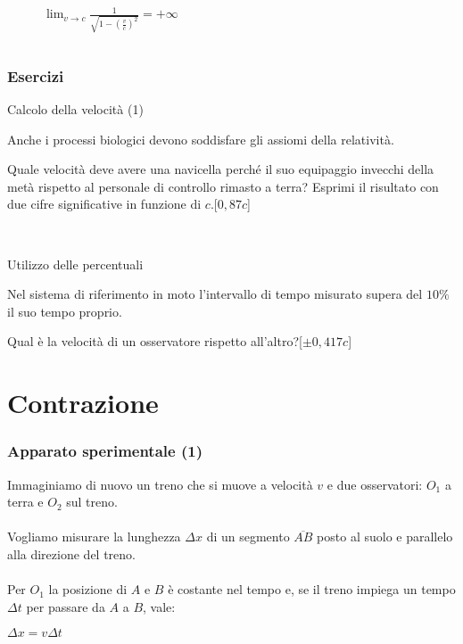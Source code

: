\documentclass[]{beamer}
\theoremstyle{plain}
\begin{document}
\begin{frame}
\begin{columns}
\begin{column}{0.6\textwidth}
\begin{figure}
~

\footnotesize
$ \displaystyle \lim_{v \to c} \frac{1}{\sqrt{1- \left( \frac{v}{c} \right)^2 }} = + \infty  $

\end{figure}
\end{column}
\end{columns}
\end{frame}





\begin{frame}
\frametitle{Esercizi}
\begin{exampleblock}{Calcolo della velocità (1)}
\small{
  Anche i processi biologici devono soddisfare gli assiomi della relatività.

  Quale velocità deve avere una navicella perché il suo equipaggio invecchi della metà rispetto al personale di controllo rimasto a terra? Esprimi il risultato con due cifre significative in funzione di $ c $.\hspace*{\fill}[$ 0,87c $]
  }
\end{exampleblock}

~

\begin{exampleblock}{Utilizzo delle percentuali}
\small{
  Nel sistema di riferimento in moto l'intervallo di tempo misurato supera del $ 10\% $ il suo tempo proprio.
  
  Qual è la velocità di un osservatore rispetto all'altro?\hspace*{\fill}[$ \pm 0,417c $]
  }
\end{exampleblock}
\end{frame}




\section{Contrazione}

\begin{frame}
  \frametitle{Apparato sperimentale (1)}
Immaginiamo di nuovo un treno che si muove a velocità $ v $ e due osservatori: $ O_1 $ a terra e $ O_2 $ sul treno.\\~\\
Vogliamo misurare la \alert<1>{lunghezza $ \Delta x $} di un segmento $ \overline{AB} $ posto al suolo e \alert<1>{parallelo alla direzione del treno}.\\~\pause\\
\alert<2>{Per $ O_1 $ la posizione di $ A $ e $ B $ è costante nel tempo} e, se il treno impiega un tempo $ \Delta t $ per passare da $ A $ a $ B $, vale:
\begin{center}
\colorbox{blue!30}{$ \Delta x = v \Delta t $}
\end{center}
\end{frame}
\end{document}
